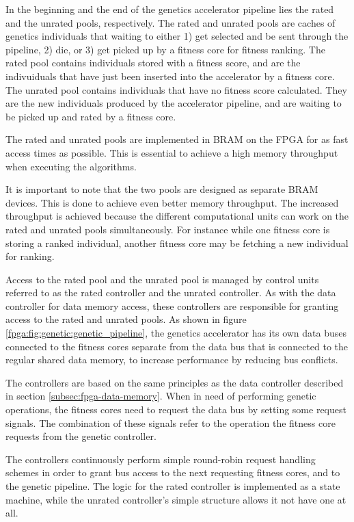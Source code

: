 In the beginning and the end of the genetics accelerator pipeline lies the rated and the unrated pools, respectively.
The rated and unrated pools are caches of genetics individuals that waiting to either 1) get selected and be sent through the pipeline, 2) die, or 3) get picked up by a fitness core for fitness ranking.
The rated pool contains individuals stored with a fitness score, and are the indivuiduals that have just been inserted into the accelerator by a fitness core.
The unrated pool contains individuals that have no fitness score calculated.
They are the new individuals produced by the accelerator pipeline, and are waiting to be picked up and rated by a fitness core.

The rated and unrated pools are implemented in \gls{BRAM} on the FPGA for as fast access times as possible.
This is essential to achieve a high memory throughput when executing the algorithms.

It is important to note that the two pools are designed as separate \gls{BRAM} devices.
This is done to achieve even better memory throughput.
The increased throughput is achieved because the different computational units can work on the rated and unrated pools simultaneously.
For instance while one fitness core is storing a ranked individual, another fitness core may be fetching a new individual for ranking. 

Access to the \gls{rated pool} and the \gls{unrated pool} is managed by control units referred to as the \gls{rated controller} and the \gls{unrated controller}.
As with the \gls{data controller} for data memory access, these controllers are responsible for granting access to the rated and unrated pools.
As shown in figure \vref{fpga:fig:genetic:genetic_pipeline}, the genetics accelerator has its own data buses connected to the fitness cores separate from the data bus that is connected to the regular shared data memory, to increase performance by reducing bus conflicts.

The controllers are based on the same principles as the \gls{data controller} described in section \vref{subsec:fpga-data-memory}.
When in need of performing genetic operations, the fitness cores need to request the data bus by setting some request signals.
The combination of these signals refer to the operation the fitness core requests from the genetic controller. 

The controllers continuously perform simple round-robin request handling schemes in order to grant bus access to the next requesting fitness cores, and to the genetic pipeline.
The logic for the \gls{rated controller} is implemented as a state machine, while the \gls{unrated controller}'s simple structure allows it not have one at all.

